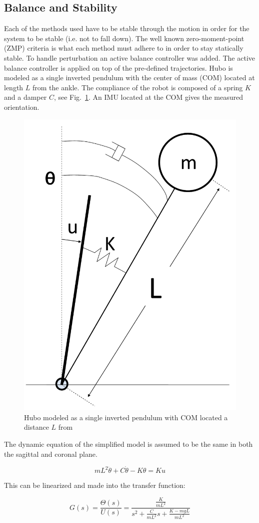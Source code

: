 \subsection{\bf Balance and Stability}\label{sec:sec:balance}
Each of the methods used have to be stable through the motion in order for the system to be stable (i.e. not to fall down).  
The well known zero-moment-point (ZMP) criteria is what each method must adhere to in order to stay statically stable\cite{Vukobratovic19721}.  
To handle perturbation an active balance controller was added.  
The active balance controller is applied on top of the pre-defined trajectories.  
Hubo is modeled as a single inverted pendulum with the center of mass (COM) located at length $L$ from the ankle.  
The compliance of the robot is composed of a spring $K$ and a damper $C$, see Fig.~\ref{fig:invPen}.  
An IMU located at the COM gives the measured orientation.

\begin{figure}[h]
  \centering
\includegraphics[width=0.4\columnwidth]{./pix/invPen3.pdf}
  \caption{Hubo modeled as a single inverted pendulum with COM located a distance $L$ from }
  \label{fig:invPen}
\end{figure}

The dynamic equation of the simplified model is assumed to be the same in both the sagittal and coronal plane.

\begin{equation}
mL^2\ddot{\theta}+C\dot{\theta}-K\theta = Ku
\end{equation}

This can be linearized and made into the transfer function:

\begin{equation}
G(s) = \frac{\Theta(s)}{U(s)} = \frac{\frac{K}{mL^2}}{s^2+\frac{C}{mL^2}s + \frac{K-mgL}{mL^2}}
\end{equation}

